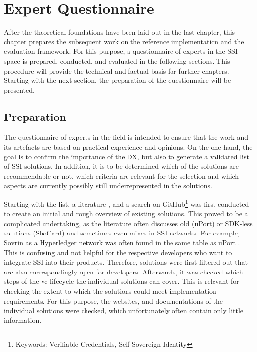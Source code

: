 
\chapter{Expert Questionnaire}\label{chapter: expert}
    
    After the theoretical foundations have been laid out in the last chapter, this chapter prepares the subsequent work on the reference implementation and the evaluation framework. For this purpose, a questionnaire of experts in the \ac{SSI} space is prepared, conducted, and evaluated in the following sections. This procedure will provide the technical and factual basis for further chapters. Starting with the next section, the preparation of the questionnaire will be presented.
   
    \section{Preparation}
    
    The questionnaire of experts in the field is intended to ensure that the work and its artefacts are based on practical experience and opinions. On the one hand, the goal is to confirm the importance of the \ac{DX}, but also to generate a validated list of \ac{SSI} solutions. In addition, it is to be determined which of the solutions are recommendable or not, which criteria are relevant for the selection and which aspects are currently possibly still underrepresented in the solutions.
    
    Starting with the list, a literature \cite{bouras_distributed_2020, bernabe_privacy-preserving_2019, dib_decentralized_2020, dunphy_first_2018, ferdous_search_2019, kuperberg_blockchain-based_2020, van_bokkem_self-sovereign_2019, friedewald_self-sovereign_2020,gruner_relevance_2018}, and a search on GitHub\footnote{Keywords: Verifiable Credentials, Self Sovereign Identity} was first conducted to create an initial and rough overview of existing solutions. This proved to be a complicated undertaking, as the literature often discusses old (uPort) or SDK-less solutions (ShoCard) and sometimes even mixes in \ac{SSI} networks. For example, Sovrin as a Hyperledger network was often found in the same table as uPort \cite{bouras_distributed_2020, bernabe_privacy-preserving_2019, dib_decentralized_2020, dunphy_first_2018}. This is confusing and not helpful for the respective developers who want to integrate \ac{SSI} into their products. Therefore, solutions were first filtered out that are also correspondingly open for developers. Afterwards, it was checked which steps of the \ac{vc} lifecycle \cite{sporny_verifiable_2019} the individual solutions can cover. This is relevant for checking the extent to which the solutions could meet implementation requirements. For this purpose, the websites, and documentations of the individual solutions were checked, which unfortunately often contain only little information.
    
